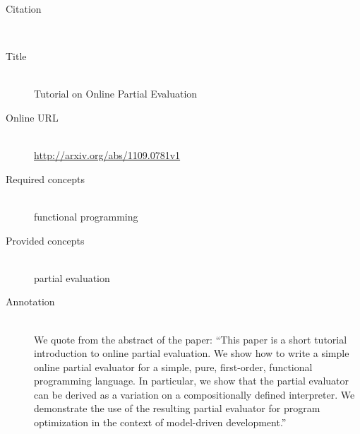 \begin{description}
\item[Citation]\mbox{}\\
\cite{CookL11}
\item[Title]\mbox{}\\
Tutorial on Online Partial Evaluation
\item[Online URL]\mbox{}\\
{\footnotesize\url{http://arxiv.org/abs/1109.0781v1}}
\item[Required concepts]\mbox{}\\
functional programming\item[Provided concepts]\mbox{}\\
partial evaluation\item[Annotation]\mbox{}\\
We quote from the abstract of the paper: ``This paper is a short tutorial introduction to online partial evaluation. We show how to write a simple online partial evaluator for a simple, pure, first-order, functional programming language. In particular, we show that the partial evaluator can be derived as a variation on a compositionally defined interpreter. We demonstrate the use of the resulting partial evaluator for program optimization in the context of model-driven development.''
\end{description}

